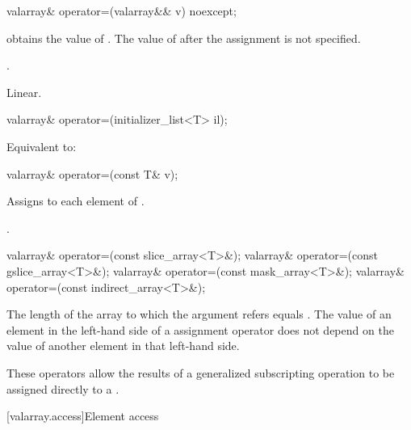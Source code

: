 %
\begin{itemdecl}
valarray& operator=(valarray&& v) noexcept;
\end{itemdecl}

\begin{itemdescr}
\pnum
\effects
{} obtains the value of .
The value of  after the assignment is not specified.

\pnum
\returns
{}.

\pnum
\complexity
Linear.
\end{itemdescr}

%
\begin{itemdecl}
valarray& operator=(initializer_list<T> il);
\end{itemdecl}

\begin{itemdescr}
\pnum
\effects
Equivalent to: 
\end{itemdescr}


%
\begin{itemdecl}
valarray& operator=(const T& v);
\end{itemdecl}

\begin{itemdescr}
\pnum
\effects
Assigns  to each element of .

\pnum
\returns
{}.
\end{itemdescr}

%
\begin{itemdecl}
valarray& operator=(const slice_array<T>&);
valarray& operator=(const gslice_array<T>&);
valarray& operator=(const mask_array<T>&);
valarray& operator=(const indirect_array<T>&);
\end{itemdecl}

\begin{itemdescr}
\pnum
\expects
The length of the array to which the argument refers equals .
The value of an element in the left-hand side of a  assignment
operator does not depend on the value of another element in that left-hand side.

\pnum
These operators allow the results of a generalized subscripting operation
to be assigned directly to a
.
\end{itemdescr}

[valarray.access]{Element access}

